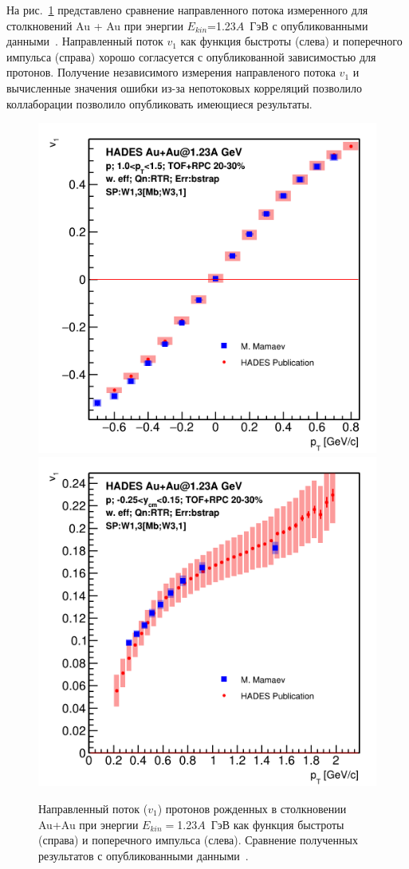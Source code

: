 На рис.~\ref{fig:hades_v1_publ_comparison} представлено сравнение направленного потока измеренного для столкновений Au + Au при энергии $E_{kin}$=1.23$A$~ГэВ с опубликованными данными~\cite{HADES:2020lob}.
Направленный поток $v_1$ как функция быстроты (слева) и поперечного импульса (справа) хорошо согласуется с опубликованной зависимостью для протонов.
Получение независимого измерения направленого потока $v_1$ и вычисленные значения ошибки из-за непотоковых корреляций позволило коллаборации позволило опубликовать имеющиеся результаты.
%
\begin{figure}[ht]
\begin{center}
\includegraphics[width=0.45\linewidth]{images/v1_au123_publication_ycm.png}
\includegraphics[width=0.45\linewidth]{images/v1_au123_publication_pT.png}
\caption{Направленный поток ($v_1$) протонов  рожденных в столкновении Au+Au при энергии $E_{kin}=$1.23$A$~ГэВ как функция быстроты (справа) и поперечного импульса (слева). Сравнение полученных результатов с опубликованными данными~\cite{HADES:2020lob}. }
\label{fig:hades_v1_publ_comparison}
\end{center}
\end{figure}


